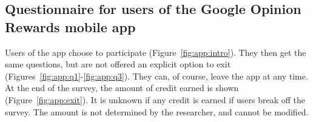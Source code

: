                      

\subsection{Questionnaire for users of the Google Opinion Rewards mobile app}

Users of the app choose to participate (Figure~\ref{fig:app:intro}). They then get the same questions, but are not offered an explicit option to exit (Figures~\ref{fig:app:q1}-\ref{fig:app:q3}). They can, of course, leave the app at any time. At the end of the survey, the amount of credit earned is shown (Figure~\ref{fig:app:exit}). It is unknown if any credit is earned if users break off the survey. The amount is not determined by the researcher, and cannot be modified. 

